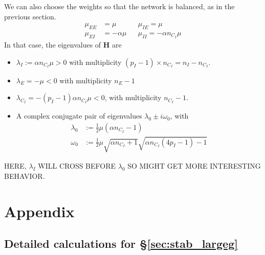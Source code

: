 \documentclass[11pt,reqno]{amsart}
\newcommand{\Hvec}{\mathbf{H}}
\begin{document}
We can also choose the weights so that the network is balanced, as in the previous section.
\begin{align*}
\mu_{EE} &= \mu && \mu_{IE} = \mu \\
\mu_{EI} &= -\alpha \mu && \mu_{II} = -\alpha n_{C_I} \mu
\end{align*}
In that case, the eigenvalues of $\Hvec$ are
\begin{itemize}
\item $\lambda_I := \alpha n_{C_I} \mu > 0$ with multiplicity $(p_I-1) \times n_{C_I} = n_I - n_{C_I}$.
\item $\lambda_E = -\mu < 0$ with multiplicity $n_E - 1$
\item $\lambda_{C_I} = -(p_I-1) \alpha n_{C_I} \mu < 0$, with multiplicity $n_{C_I} -1$.
\item A complex conjugate pair of eigenvalues $\lambda_0 \pm i \omega_0$, with 
\begin{align*}
    \lambda_0 &:= \frac{1}{2}\mu(\alpha n_{C_I} - 1)
      \\
    \omega_0 &:= \frac{1}{2}\mu \sqrt{ \alpha n_{C_I}+1} \sqrt{\alpha n_{C_I}(4p_I - 1) - 1}
\end{align*}
\end{itemize}
HERE, $\lambda_I$ WILL CROSS BEFORE $\lambda_0$ SO MIGHT GET MORE INTERESTING BEHAVIOR.

\section{Appendix}
\subsection{Detailed calculations for \S \ref{sec:stab_largeg}}
\end{document}
